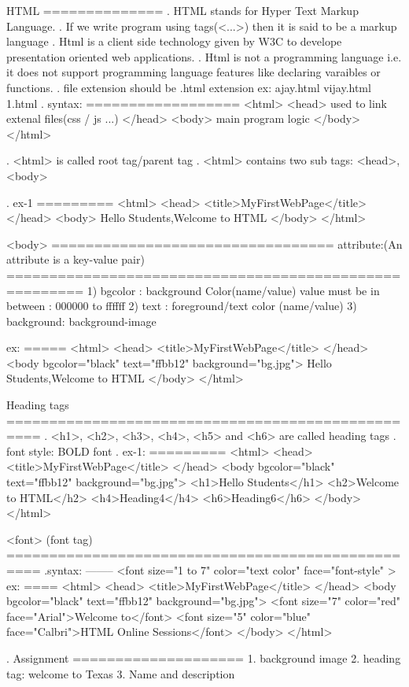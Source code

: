 HTML
==============
. HTML stands for Hyper Text Markup Language.
. If we write program using tags(<...>) then it is said to be a markup language
. Html is a client side technology given by W3C to develope presentation oriented web applications.
. Html is not a programming language i.e. it does not support programming language features like declaring varaibles or functions.
. file extension should be .html extension
  ex:
      ajay.html
      vijay.html
      1.html
. syntax:
==================
<html>
  <head>
     used to link extenal files(css / js ...)
  </head>
  <body>
    main program logic
  </body>
</html>

. <html> is called root tag/parent tag
. <html> contains two sub tags: <head>,<body>

. ex-1
=========
<html>
   <head>
     <title>MyFirstWebPage</title>
   </head>
   <body>
     Hello Students,Welcome to HTML
   </body>
</html>

<body>
=================================
attribute:(An attribute is a key-value pair)
=======================================================
1) bgcolor : background Color(name/value)
	     value must be in between : 000000 to ffffff
2) text    : foreground/text color (name/value)
3) background: background-image

ex:
=====
<html>
   <head>
     <title>MyFirstWebPage</title>
   </head>
   <body bgcolor="black" text="ffbb12" background="bg.jpg">
     Hello Students,Welcome to HTML
   </body>
</html>

Heading tags
==================================================
. <h1>, <h2>, <h3>, <h4>, <h5> and <h6> are called heading tags
. font style: BOLD font
. ex-1:
=========
<html>
   <head>
     <title>MyFirstWebPage</title>
   </head>
   <body bgcolor="black" text="ffbb12" background="bg.jpg">
	 <h1>Hello Students</h1>
	 <h2>Welcome to HTML</h2>
	 <h4>Heading4</h4>
	 <h6>Heading6</h6>
   </body>
</html>

<font> (font tag)
==================================================
.syntax:
--------
<font size="1 to 7" color="text color" face="font-style" >
ex:
====
<html>
   <head>
     <title>MyFirstWebPage</title>
   </head>
   <body bgcolor="black" text="ffbb12" background="bg.jpg">
     <font size="7" color="red" face="Arial">Welcome to</font>
     <font size="5" color="blue" face="Calbri">HTML Online Sessions</font>
   </body>
</html>

. Assignment
====================
1. background image
2. heading tag: welcome to Texas
3. Name and description
